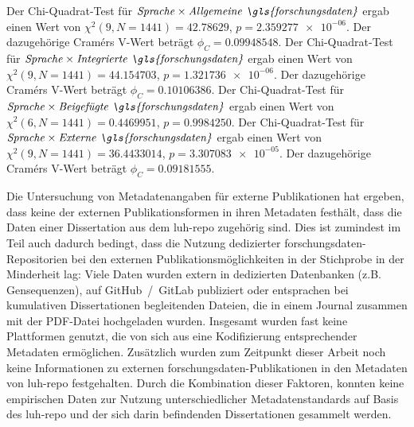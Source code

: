 Der Chi-Quadrat-Test für $\text{\textit{Sprache}}\times\text{\textit{Allgemeine \gls{forschungsdaten}}}$ ergab einen Wert von $\chi^2 (\num{9}, N = \num{1441}) = \num[round-mode=places,round-precision=3]{42.78629}$, $p = \num[round-mode=places,round-precision=3]{2.359277e-06}$.
Der dazugehörige Cramérs V-Wert beträgt $\phi_C=\num[round-mode=places,round-precision=3]{0.09948548}$.
Der Chi-Quadrat-Test für $\text{\textit{Sprache}}\times\text{\textit{Integrierte \gls{forschungsdaten}}}$ ergab einen Wert von $\chi^2 (\num{9}, N = \num{1441}) = \num[round-mode=places,round-precision=3]{44.154703}$, $p = \num[round-mode=places,round-precision=3]{1.321736e-06}$.
Der dazugehörige Cramérs V-Wert beträgt $\phi_C=\num[round-mode=places,round-precision=3]{0.10106386}$.
Der Chi-Quadrat-Test für $\text{\textit{Sprache}}\times\text{\textit{Beigefügte \gls{forschungsdaten}}}$ ergab einen Wert von $\chi^2 (\num{6}, N = \num{1441}) = \num[round-mode=places,round-precision=3]{0.4469951}$, $p = \num[round-mode=places,round-precision=3]{0.9984250}$.
Der Chi-Quadrat-Test für $\text{\textit{Sprache}}\times\text{\textit{Externe \gls{forschungsdaten}}}$ ergab einen Wert von $\chi^2 (\num{9}, N = \num{1441}) = \num[round-mode=places,round-precision=3]{36.4433014}$, $p = \num[round-mode=places,round-precision=3]{3.307083e-05}$.
Der dazugehörige Cramérs V-Wert beträgt $\phi_C=\num[round-mode=places,round-precision=3]{0.09181555}$.

Die Untersuchung von Metadatenangaben für externe Publikationen hat ergeben, dass keine der externen Publikationsformen in ihren Metadaten festhält, dass die Daten einer Dissertation aus dem \gls{luh-repo} zugehörig sind.
Dies ist zumindest im Teil auch dadurch bedingt, dass die Nutzung dedizierter \gls{forschungsdaten}-Repositorien bei den externen Publikationsmöglichkeiten in der Stichprobe in der Minderheit lag:
Viele Daten wurden extern in dedizierten Datenbanken (z.B. Gensequenzen), auf GitHub~/~GitLab publiziert oder entsprachen bei kumulativen Dissertationen begleitenden Dateien, die in einem Journal zusammen mit der PDF-Datei hochgeladen wurden.
Insgesamt wurden fast keine Plattformen genutzt, die von sich aus eine Kodifizierung entsprechender Metadaten ermöglichen.
Zusätzlich wurden zum Zeitpunkt dieser Arbeit noch keine Informationen zu externen \gls{forschungsdaten}-Publikationen in den Metadaten von \gls{luh-repo} festgehalten.
Durch die Kombination dieser Faktoren, konnten keine empirischen Daten zur Nutzung unterschiedlicher Metadatenstandards auf Basis des \gls{luh-repo} und der sich darin befindenden Dissertationen gesammelt werden.

